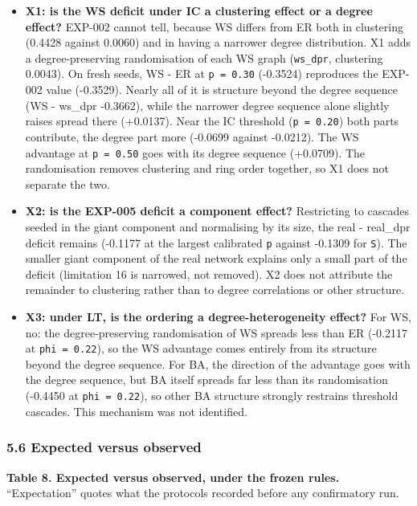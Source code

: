 \documentclass[
]{article}
\providecommand{\tightlist}{%
  \setlength{\itemsep}{0pt}\setlength{\parskip}{0pt}}
\begin{document}
\begin{itemize}
\tightlist
\item
  \textbf{X1: is the WS deficit under IC a clustering effect or a degree
  effect?} EXP-002 cannot tell, because WS differs from ER both in
  clustering (0.4428 against 0.0060) and in having a narrower degree
  distribution. X1 adds a degree-preserving randomisation of each WS
  graph (\texttt{ws\_dpr}, clustering 0.0043). On fresh seeds, WS - ER
  at \texttt{p\ =\ 0.30} (-0.3524) reproduces the EXP-002 value
  (-0.3529). Nearly all of it is structure beyond the degree sequence
  (WS - ws\_dpr -0.3662), while the narrower degree sequence alone
  slightly raises spread there (+0.0137). Near the IC threshold
  (\texttt{p\ =\ 0.20}) both parts contribute, the degree part more
  (-0.0699 against -0.0212). The WS advantage at \texttt{p\ =\ 0.50}
  goes with its degree sequence (+0.0709). The randomisation removes
  clustering and ring order together, so X1 does not separate the two.
\item
  \textbf{X2: is the EXP-005 deficit a component effect?} Restricting to
  cascades seeded in the giant component and normalising by its size,
  the real - real\_dpr deficit remains (-0.1177 at the largest
  calibrated \texttt{p} against -0.1309 for \texttt{S}). The smaller
  giant component of the real network explains only a small part of the
  deficit (limitation 16 is narrowed, not removed). X2 does not
  attribute the remainder to clustering rather than to degree
  correlations or other structure.
\item
  \textbf{X3: under LT, is the ordering a degree-heterogeneity effect?}
  For WS, no: the degree-preserving randomisation of WS spreads less
  than ER (-0.2117 at \texttt{phi\ =\ 0.22}), so the WS advantage comes
  entirely from its structure beyond the degree sequence. For BA, the
  direction of the advantage goes with the degree sequence, but BA
  itself spreads far less than its randomisation (-0.4450 at
  \texttt{phi\ =\ 0.22}), so other BA structure strongly restrains
  threshold cascades. This mechanism was not identified.
\end{itemize}

\subsubsection{5.6 Expected versus
observed}\label{expected-versus-observed}

\textbf{Table 8. Expected versus observed, under the frozen rules.}
``Expectation'' quotes what the protocols recorded before any
confirmatory run.
\end{document}
